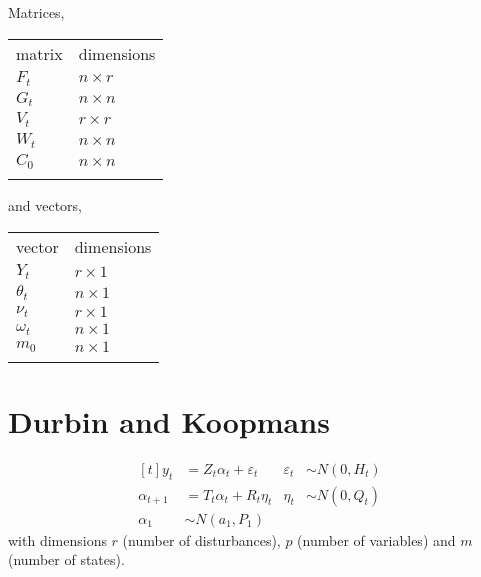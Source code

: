 \documentclass{article}
\begin{document}
Matrices,
\begin{longtable}[c]{@{}ll@{}}
\hline\noalign{\medskip}
matrix & dimensions
\\\noalign{\medskip}
\hline\noalign{\medskip}
$F_t$ & $n \times r$
\\\noalign{\medskip}
$G_t$ & $n \times n$
\\\noalign{\medskip}
$V_t$ & $r \times r$
\\\noalign{\medskip}
$W_t$ & $n \times n$
\\\noalign{\medskip}
$C_0$ & $n \times n$
\\\noalign{\medskip}
\hline
\end{longtable}
and vectors,
\begin{longtable}[c]{@{}ll@{}}
\hline\noalign{\medskip}
vector & dimensions
\\\noalign{\medskip}
\hline\noalign{\medskip}
$Y_t$ & $r \times 1$
\\\noalign{\medskip}
$\theta_t$ & $n \times 1$
\\\noalign{\medskip}
$\nu_t$ & $r \times 1$
\\\noalign{\medskip}
$\omega_t$ & $n \times 1$
\\\noalign{\medskip}
$m_0$ & $n \times 1$
\\\noalign{\medskip}
\hline
\end{longtable}

\section{Durbin and Koopmans}

\begin{equation*}
\begin{aligned}[t]
  y_t &= Z_t \alpha_{t} + \varepsilon_t & \varepsilon_t & \sim N(0, H_t) \\
  \alpha_{t+1} &= T_t \alpha_{t} + R_t \eta_t & \eta_t & \sim N(0, Q_t) \\
  \alpha_1 &\sim N(a_1, P_1)
\end{aligned}
\end{equation*}
with dimensions $r$ (number of disturbances), $p$ (number of variables)
and $m$ (number of states).
\end{document}
